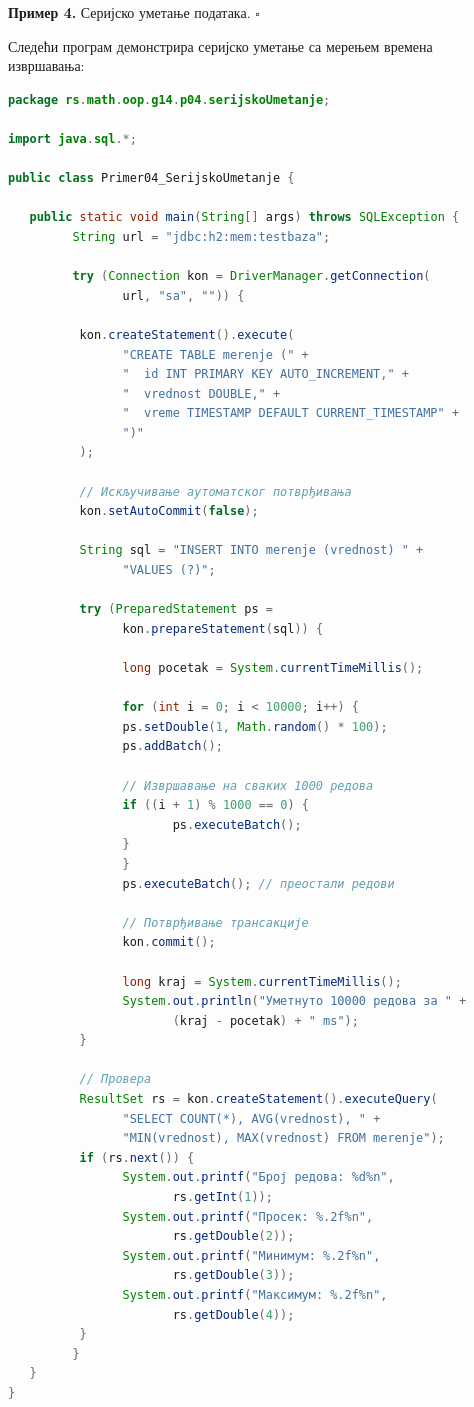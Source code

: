 \bigskip

\noindent \textbf{Пример 4.} Серијско уметање података. $\square$

\medskip

Следећи програм демонстрира серијско уметање са мерењем времена извршавања:


\begin{lstlisting}[language=Java]
package rs.math.oop.g14.p04.serijskoUmetanje;
 
import java.sql.*;
 
public class Primer04_SerijskoUmetanje {
 
   public static void main(String[] args) throws SQLException {
         String url = "jdbc:h2:mem:testbaza";
 
         try (Connection kon = DriverManager.getConnection(
                url, "sa", "")) {
 
          kon.createStatement().execute(
                "CREATE TABLE merenje (" +
                "  id INT PRIMARY KEY AUTO_INCREMENT," +
                "  vrednost DOUBLE," +
                "  vreme TIMESTAMP DEFAULT CURRENT_TIMESTAMP" +
                ")"
          );
 
          // Искључивање аутоматског потврђивања
          kon.setAutoCommit(false);
 
          String sql = "INSERT INTO merenje (vrednost) " +
                "VALUES (?)";
 
          try (PreparedStatement ps =
                kon.prepareStatement(sql)) {
 
                long pocetak = System.currentTimeMillis();
 
                for (int i = 0; i < 10000; i++) {
                ps.setDouble(1, Math.random() * 100);
                ps.addBatch();
 
                // Извршавање на сваких 1000 редова
                if ((i + 1) % 1000 == 0) {
                       ps.executeBatch();
                }
                }
                ps.executeBatch(); // преостали редови
 
                // Потврђивање трансакције
                kon.commit();
 
                long kraj = System.currentTimeMillis();
                System.out.println("Уметнуто 10000 редова за " +
                       (kraj - pocetak) + " ms");
          }
 
          // Провера
          ResultSet rs = kon.createStatement().executeQuery(
                "SELECT COUNT(*), AVG(vrednost), " +
                "MIN(vrednost), MAX(vrednost) FROM merenje");
          if (rs.next()) {
                System.out.printf("Број редова: %d%n",
                       rs.getInt(1));
                System.out.printf("Просек: %.2f%n",
                       rs.getDouble(2));
                System.out.printf("Минимум: %.2f%n",
                       rs.getDouble(3));
                System.out.printf("Максимум: %.2f%n",
                       rs.getDouble(4));
          }
         }
   }
}
\end{lstlisting}


